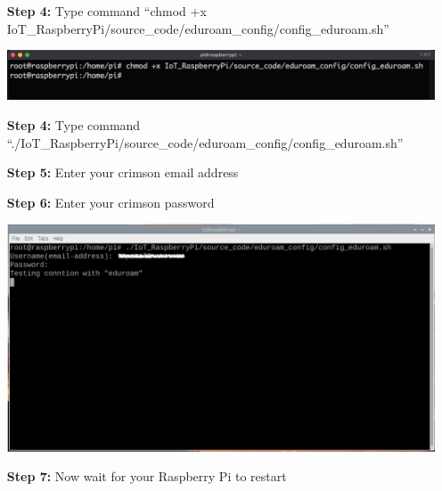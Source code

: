 \begin{itemize}[leftmargin=1.8cm]
\begin{minipage}{\textwidth}
					\vspace{2mm}
				\end{minipage}
			\item[\textbf{Step 4:}] Type command ``chmod +x IoT\_RaspberryPi/source\_code/eduroam\_config/config\_eduroam.sh''\\
				\begin{minipage}{\textwidth}
					\vspace{2mm}
					\includegraphics[scale=0.35]{Images/raspberry_pi/eduroam_config/permission_x.png}
					\vspace{2mm}
				\end{minipage}
			\item[\textbf{Step 4:}] Type command ``./IoT\_RaspberryPi/source\_code/eduroam\_config/config\_eduroam.sh''
			\item[\textbf{Step 5:}] Enter your crimson email address
			\item[\textbf{Step 6:}] Enter your crimson password\\
				\begin{minipage}{\textwidth}
					\vspace{2mm}
					\includegraphics[scale=0.33]{Images/raspberry_pi/eduroam_config/run_eduroam_conf.png}
					\vspace{2mm}
				\end{minipage}
			\item[\textbf{Step 7:}] Now wait for your Raspberry Pi to restart
		\end{itemize}